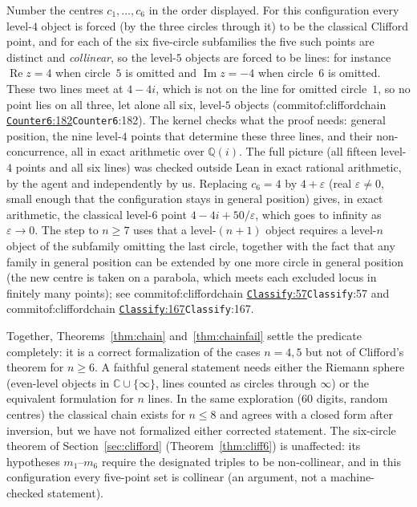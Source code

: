 \documentclass[11pt]{article}
\theoremstyle{definition}
\theoremstyle{remark}
\newcommand{\CC}{\mathbb{C}}
\newcommand{\commitof}[1]{\csname commitof:#1\endcsname}
\newcommand{\repo}[1]{https://github.com/jpbald93/#1}
\newcommand{\src}[4]{\ifcsname commitof:#1\endcsname
  \href{\repo{#1}/blob/\commitof{#1}/#2/#3.lean\#L#4}{\texttt{#3}:#4}\else\texttt{#3}:#4\fi}
\begin{document}
Number the centres $c_1,\dots,c_6$ in the order displayed. For this configuration every level-$4$
object is forced (by the three circles through it) to be the classical Clifford point, and for each
of the six five-circle subfamilies the five such points are distinct and \emph{collinear}, so the
level-$5$ objects are forced to be lines: for instance $\operatorname{Re}z=4$ when circle~$5$ is omitted
and $\operatorname{Im}z=-4$ when circle~$6$ is omitted. These two lines meet at $4-4i$, which is not on
the line for omitted circle~$1$, so no point lies on all three, let alone all six, level-$5$ objects
(\src{cliffordchain}{Clifford}{Counter6}{182}). The kernel checks what the proof needs: general position,
the nine level-$4$ points that determine these three lines, and their non-concurrence, all in exact
arithmetic over $\mathbb{Q}(i)$. The full picture (all fifteen level-$4$ points and all six lines) was
checked outside Lean in exact rational arithmetic, by the agent and independently by us. Replacing $c_6=4$ by $4+\varepsilon$ (real $\varepsilon\ne0$, small enough that the configuration stays in general position) gives, in exact arithmetic, the
classical level-$6$ point $4-4i+50/\varepsilon$, which goes to infinity as $\varepsilon\to0$. The step to $n\ge7$ uses that a level-$(n+1)$ object requires a level-$n$
object of the subfamily omitting the last circle, together with the fact that any family in general
position can be extended by one more circle in general position (the new centre is taken on a parabola,
which meets each excluded locus in finitely many points); see \src{cliffordchain}{Clifford}{Classify}{57}
and \src{cliffordchain}{Clifford}{Classify}{167}.

Together, Theorems~\ref{thm:chain} and~\ref{thm:chainfail} settle the predicate completely: it is a
correct formalization of the cases $n=4,5$ but not of Clifford's theorem for $n\ge6$. A faithful general statement needs either
the Riemann sphere (even-level objects in $\CC\cup\{\infty\}$, lines counted as circles through
$\infty$) or the equivalent formulation for $n$ lines. In the same exploration (60 digits, random
centres) the classical chain exists for $n\le8$ and agrees with a closed form after inversion, but we
have not formalized either corrected statement. The six-circle theorem of Section~\ref{sec:clifford}
(Theorem~\ref{thm:cliff6}) is unaffected: its hypotheses $m_1$--$m_6$ require the designated triples to be non-collinear, and in this
configuration every five-point set is collinear (an argument, not a machine-checked statement).
\end{document}
